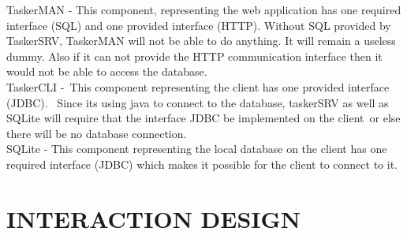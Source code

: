 \documentclass{project}
\begin{document}
TaskerMAN - This component, representing the web application has one required interface (SQL) and one provided interface (HTTP). Without SQL provided by TaskerSRV, TaskerMAN will not be able to do anything. It will remain a useless dummy. Also if it can not provide the HTTP communication interface then it would not be able to access the database. \\
\newline 
TaskerCLI - This component representing the client has one provided interface (JDBC).  Since its using java to connect to the database, taskerSRV as well as SQLite will require that the interface JDBC be implemented on the client or else there will be no database connection. \\
\newline SQLite - This component representing the local database on the client has one required interface (JDBC) which makes it possible for the client to connect to it.
\clearpage
\section{INTERACTION DESIGN}
\end{document}
